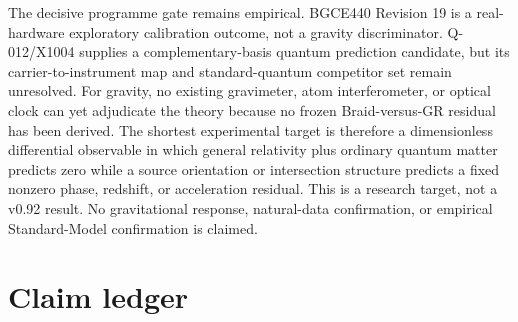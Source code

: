 \documentclass[11pt]{article}
\theoremstyle{definition}
\theoremstyle{remark}
\begin{document}
The decisive programme gate remains empirical. BGCE440 Revision 19 is a real-hardware exploratory calibration outcome, not a gravity discriminator. Q-012/X1004 supplies a complementary-basis quantum prediction candidate, but its carrier-to-instrument map and standard-quantum competitor set remain unresolved. For gravity, no existing gravimeter, atom interferometer, or optical clock can yet adjudicate the theory because no frozen Braid-versus-GR residual has been derived. The shortest experimental target is therefore a dimensionless differential observable in which general relativity plus ordinary quantum matter predicts zero while a source orientation or intersection structure predicts a fixed nonzero phase, redshift, or acceleration residual. This is a research target, not a v0.92 result. No gravitational response, natural-data confirmation, or empirical Standard-Model confirmation is claimed.

\section{Claim ledger}
\end{document}
